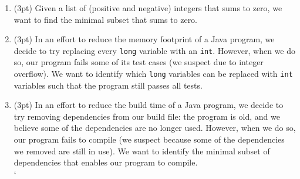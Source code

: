 \documentclass{report}
\newif\ifkey
\newcommand{\answerlong}[1]{\ifkey\color{red}\textbf{#1}\color{black}\else\vspace{0.5in}\fi\xspace}
\newcommand*{\pts}[1]{\addtocounter{points}{#1}(#1pt)}
\begin{document}
\begin{spacing}{1.4}
\begin{enumerate}[leftmargin=*]
\begin{enumerate}
    \item \pts{3} Given a list of (positive and negative) integers that sums to zero, we want to find the minimal subset that sums to zero.\\
      \answerlong{Delta debugging is not suitable for this use case: integer summation is ambiguous.}
      \vspace{0.25in}
    \item \pts{3} In an effort to reduce the memory footprint of a Java program, we decide to try replacing
      every \lstinline{long} variable with an \lstinline{int}. However, when we do so, our program fails some of its test cases (we suspect due to integer overflow). We want to
      identify which \lstinline{long} variables can be replaced with \lstinline{int} variables such that the program still passes all tests.\\
      \answerlong{Delta debugging is suitable for this use case. We can define script \lstinline{is_interesting.sh} such that it takes a
        list of occurrences of long and replaces each with an int. The script exits 1 if the code compiles and runs the tests
        successfully, and it exits 0 if the code doesn't compile or fails any tests.}
      \vspace{0.25in}
    \item \pts{3} In an effort to reduce the build time of a Java program, we decide to try removing
      dependencies from our build file: the program is old, and we believe some of the dependencies are no longer used.
      However, when we do so, our program fails to compile (we suspect because some of the dependencies we removed are
      still in use). We want to identify the minimal subset of dependencies that enables our program to compile.\\
      \answerlong{Delta debugging is suitable for this use case. We can define script \lstinline{is_interesting.sh} such that it takes a list of
        dependencies, removes them from the build file, and then attempts to compile the program. The script exits 1 if the code compiles
        successfully, and 0 if it does not.}
            \vspace{0.25in}
`     \end{enumerate}



\end{enumerate}
\end{spacing}
\end{document}

